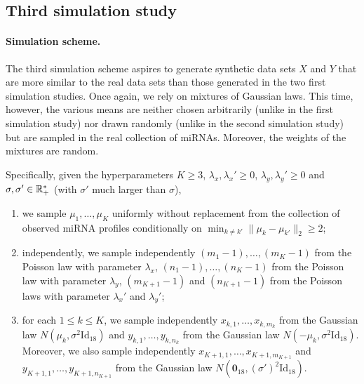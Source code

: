 \subsection{Third simulation study}
\label{subsec:simul:C}

\paragraph*{Simulation scheme.}

The third  simulation scheme aspires to  generate synthetic data sets  $X$ and
$Y$ that are  more similar to the  real data sets than those  generated in the
two first  simulation studies.  Once  again, we  rely on mixtures  of Gaussian
laws. This  time, however,  the various means  are neither  chosen arbitrarily
(unlike  in the  first simulation  study) nor  drawn randomly  (unlike in  the
second  simulation  study)   but  are  sampled  in  the   real  collection  of
miRNAs. Moreover, the weights of the mixtures are random.

Specifically,      given     the      hyperparameters     $K      \geq     3$,
$\lambda_{x},  \lambda_{x}' \geq  0$, $\lambda_{y},  \lambda_{y}' \geq  0$ and
$\sigma, \sigma' \in \mathbb{R}_{+}^{*}$ (with $\sigma'$ much larger than $\sigma$),
\begin{enumerate}
\item we sample $\mu_1, \ldots,  \mu_K$ uniformly without replacement from the
  collection     of    observed     miRNA     profiles    conditionally     on
  $\min_{k\neq k'} \|\mu_{k} - \mu_{k'}\|_{2} \geq 2$;
\item independently, we sample independently  $(m_{1} - 1), \ldots, (m_{K}-1)$
  from     the      Poisson     law     with      parameter     $\lambda_{x}$,
  $(n_{1}  -  1), \ldots,  (n_{K}-1)$  from  the  Poisson law  with  parameter
  $\lambda_{y}$, $(m_{K+1}  - 1)$ and  $(n_{K+1} -  1)$ from the  Poisson laws
  with parameter $\lambda_{x}'$ and $\lambda_{y}'$;
\item    for    each    $1\leq    k\leq   K$,    we    sample    independently
  $x_{k,    1},    \ldots,    x_{k,    m_k}$    from    the    Gaussian    law
  $N(\mu_k, \sigma^{2} \text{Id}_{18})$ and $y_{k,1}, \ldots, y_{k, n_k}$ from
  the Gaussian law $N(-\mu_k,  \sigma^{2} \text{Id}_{18})$.  Moreover, we also
  sample   independently   $x_{K+1,   1},  \ldots,   x_{K+1,   m_{K+1}}$   and
  $y_{K+1,   1},   \ldots,   y_{K+1,   n_{K+1}}$   from   the   Gaussian   law
  $N(\textbf{0}_{18}, (\sigma')^2 \text{Id}_{18})$.
\end{enumerate}

